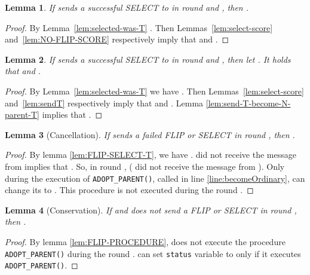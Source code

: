 \documentclass[twocolumn]{article}
\newtheorem{lemma}{Lemma}
\newcommand{\depends}[1]{}
\begin{document}
\begin{lemma}
 \label{lem:selected-T}
If  sends a successful SELECT to  in round  and , then .
\depends{\ref{lem:select-score}, \ref{lem:T-T-keep-score}, \ref{lem:selected-was-T}}
\end{lemma}

\begin{proof}
    By Lemma~\ref{lem:selected-was-T} . Then Lemmas~\ref{lem:select-score} and~\ref{lem:NO-FLIP-SCORE} respectively imply that  and .
 \end{proof}


\begin{lemma}
 \label{lem:selected-N}
If  sends a successful SELECT to  in round  and  
, then let . 
It holds that  
and .
\depends{\ref{lem:select-score}, \ref{lem:sendT}, \ref{lem:selected-was-T}, \ref{lem:send-T-become-N-parent-T}}
\end{lemma}
\begin{proof}
    By Lemma~\ref{lem:selected-was-T} we have . 
    Then Lemmas~\ref{lem:select-score} and~\ref{lem:sendT} respectively imply that  and .  
Lemma \ref {lem:send-T-become-N-parent-T}  implies that .
 \end{proof}




\begin{lemma}[Cancellation]
  \label{lem:CANCEL}
  If  sends a failed FLIP or SELECT in round , then .
\depends{\ref{lem:FLIP-SELECT-T}}
\end{lemma}

\begin{proof}
By lemma \ref{lem:FLIP-SELECT-T}, we have . 
 did not receive the message from  implies that . 
So, in round ,  ( did not receive 
the message from ).
Only during the execution of \texttt{ADOPT\_PARENT()},
called in line \ref{line:becomeOrdinary},  can change its  to .
This procedure is not executed during the round .
 \end{proof}

\begin{lemma}[Conservation]
  \label{lem:conservation}
  If  and  does not send a FLIP or SELECT in round , then .
\end{lemma}

\begin{proof}
By lemma \ref{lem:FLIP-PROCEDURE},  does not execute the procedure \texttt{ADOPT\_PARENT()} during the round .
 can set \texttt{status} variable to  only if it executes \texttt{ADOPT\_PARENT()}. 
 \end{proof}
\end{document}
